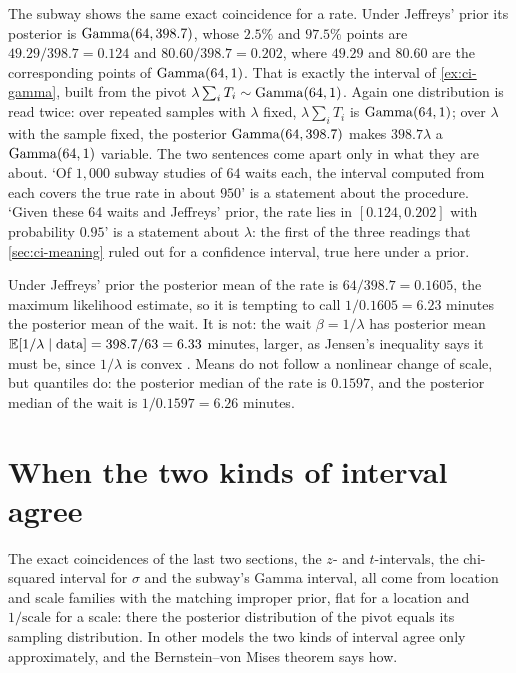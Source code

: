 The subway shows the same exact coincidence for a rate.
Under Jeffreys' prior its posterior is $\mathrm{Gamma}(64, 398.7)$, whose $2.5\%$ and $97.5\%$ points are $49.29/398.7 = 0.124$ and $80.60/398.7 = 0.202$, where $49.29$ and $80.60$ are the corresponding points of $\mathrm{Gamma}(64, 1)$.
That is exactly the interval of \cref{ex:ci-gamma}, built from the pivot $\lambda\sum_i T_i \sim \mathrm{Gamma}(64, 1)$.
Again one distribution is read twice: over repeated samples with $\lambda$ fixed, $\lambda\sum_i T_i$ is $\mathrm{Gamma}(64, 1)$; over $\lambda$ with the sample fixed, the posterior $\mathrm{Gamma}(64, 398.7)$ makes $398.7\lambda$ a $\mathrm{Gamma}(64, 1)$ variable.
The two sentences come apart only in what they are about.
`Of $1{,}000$ subway studies of $64$ waits each, the interval computed from each covers the true rate in about $950$' is a statement about the procedure.
`Given these $64$ waits and Jeffreys' prior, the rate lies in $[0.124, 0.202]$ with probability $0.95$' is a statement about $\lambda$: the first of the three readings that \cref{sec:ci-meaning} ruled out for a confidence interval, true here under a prior.

\begin{sanitycheck}
Under Jeffreys' prior the posterior mean of the rate is $64/398.7 = 0.1605$, the maximum likelihood estimate, so it is tempting to call $1/0.1605 = 6.23$ minutes the posterior mean of the wait.
It is not: the wait $\beta = 1/\lambda$ has posterior mean $\operatorname*{\mathbb{E}}[1/\lambda \mid \text{data}] = 398.7/63 = 6.33$ minutes, larger, as Jensen's inequality says it must be, since $1/\lambda$ is convex .
Means do not follow a nonlinear change of scale, but quantiles do: the posterior median of the rate is $0.1597$, and the posterior median of the wait is $1/0.1597 = 6.26$ minutes.
\end{sanitycheck}

\section{When the two kinds of interval agree}
\label{sec:jeff-agree}

The exact coincidences of the last two sections, the $z$- and $t$-intervals, the chi-squared interval for $\sigma$ and the subway's Gamma interval, all come from location and scale families with the matching improper prior, flat for a location and $1/\text{scale}$ for a scale: there the posterior distribution of the pivot equals its sampling distribution.
In other models the two kinds of interval agree only approximately, and the Bernstein--von Mises theorem says how.

